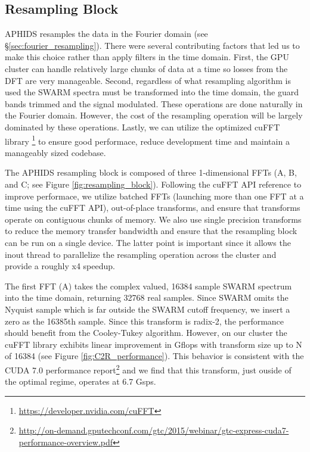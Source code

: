 \documentclass[11pt,preprint]{aastex}
\begin{document}
\subsection{Resampling Block}\label{sec:resamp_block}

APHIDS resamples the data in the Fourier domain (see \S \ref{sec:fourier_resampling}).  There were several 
contributing factors that led us to make
this choice rather than apply filters in the time domain.  First, the GPU cluster can handle relatively large 
chunks of data at a time so losses from the DFT are very manageable.  Second, regardless of 
what resampling algorithm is used the SWARM spectra must 
be transformed into the time domain, the guard bands trimmed and the signal modulated.  These operations are done 
naturally in the Fourier domain.  However, the cost of the resampling operation will be largely dominated by 
these operations.  Lastly, we can utilize the optimized cuFFT library
\footnote{\url{https://developer.nvidia.com/cuFFT}} to ensure good performace, reduce development time and 
maintain a manageably sized codebase.

The APHIDS resampling block is composed of three 1-dimensional FFTs (A, B, and C; see Figure 
\ref{fig:resampling_block}).  Following the cuFFT API reference to improve performace, we utilize batched
FFTs (launching more than one FFT at a time using the cuFFT API), out-of-place transforms, 
and ensure that transforms operate on contiguous chunks of memory.  We also use single precision transforms to 
reduce the memory transfer bandwidth and ensure that 
the resampling block can be run on a single device.  The latter point is important since it allows the inout
thread to parallelize the resampling operation across the cluster and provide a roughly x4 speedup.

The first FFT (A) takes the complex valued, 16384 sample SWARM spectrum into the time domain, returning 
32768 real samples.  Since SWARM omits the Nyquist sample which is far outside the SWARM cutoff frequency, 
we insert a zero as the 16385th sample.  Since this transform is radix-2, the performance should benefit from 
the Cooley-Tukey algorithm.  However, on our cluster the cuFFT library exhibits linear improvement in Gflops 
with transform size up to N of 16384 (see Figure \ref{fig:C2R_performance}).  This behavior is consistent with 
the CUDA 7.0 performance 
report\footnote{\url{http://on-demand.gputechconf.com/gtc/2015/webinar/gtc-express-cuda7-performance-overview.pdf}} 
and we find that this transform, just ouside of the optimal regime, operates at 6.7 Gsps.
\end{document}

